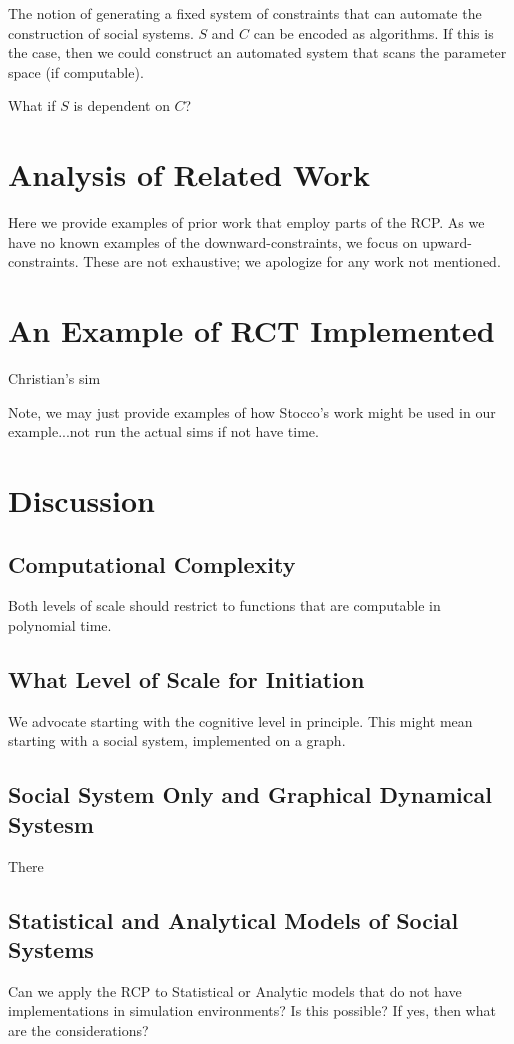 \documentclass{article}
\begin{document}
 
The notion of generating a fixed system of constraints that can automate the construction of social systems.  $S$ and $C$ can be encoded as algorithms.  If this is the case, then we could construct an automated system that scans the parameter space (if computable).

What if $S$ is dependent on $C$?


\section{Analysis of Related Work}
Here we provide examples of prior work that employ parts of the RCP.  As we have no known examples of the downward-constraints, we focus on upward-constraints.  These are not exhaustive; we apologize for any work not mentioned.  

\section{An Example of RCT Implemented}
Christian's sim

Note, we may just provide examples of how Stocco's work might be used in our example...not run the actual sims if not have time.

\section{Discussion}
\subsection{Computational Complexity}
Both levels of scale should restrict to functions that are computable in polynomial time.  

\subsection{What Level of Scale for Initiation}
We advocate starting with the cognitive level in principle.  This might mean starting with a social system, implemented on a graph. 

\subsection{Social System Only and Graphical Dynamical Systesm}
There 

\subsection{Statistical and Analytical Models of Social Systems}
Can we apply the RCP to Statistical or Analytic models that do not have implementations in simulation environments?  Is this possible?  If yes, then what are the considerations?
\end{document}
